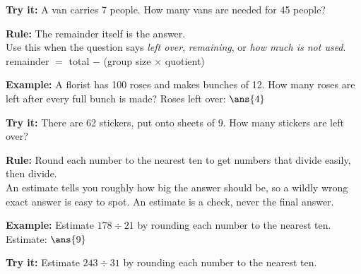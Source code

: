 \documentclass[12pt]{article}
\begin{document}
\begin{tryitbox}
\textbf{Try it:} \quad A van carries 7 people. How many vans are needed for 45 people?\\[2pt]
\end{tryitbox}


\begin{formulabox}
\textbf{Rule:} The remainder itself is the answer.\\[3pt]
Use this when the question says \emph{left over}, \emph{remaining}, or \emph{how much is not used}.\\[3pt]
remainder $=$ total $-$ (group size $\times$ quotient)
\end{formulabox}

\begin{examplebox}
\textbf{Example:} \quad A florist has 100 roses and makes bunches of 12. How many roses are left after every full bunch is made?
Roses left over: $\ans{4}$
\end{examplebox}

\begin{tryitbox}
\textbf{Try it:} \quad There are 62 stickers, put onto sheets of 9. How many stickers are left over?\\[2pt]
\end{tryitbox}


\begin{formulabox}
\textbf{Rule:} Round each number to the nearest ten to get numbers that divide easily, then divide.\\[3pt]
An estimate tells you roughly how big the answer should be, so a wildly wrong exact answer is easy to spot. An estimate is a check, never the final answer.
\end{formulabox}

\begin{examplebox}
\textbf{Example:} \quad Estimate $178 \div 21$ by rounding each number to the nearest ten.
Estimate: $\ans{9}$
\end{examplebox}

\begin{tryitbox}
\textbf{Try it:} \quad Estimate $243 \div 31$ by rounding each number to the nearest ten.\\[2pt]
\end{tryitbox}
\end{document}
